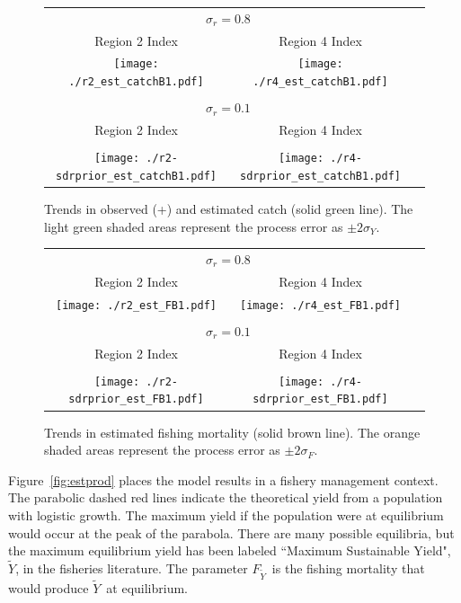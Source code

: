 \documentclass[12pt,letterpaper]{article}
\newcommand\MSY{\widetilde{Y}}
\newcommand\Fmsy{F_{\MSY}}
\begin{document}
\begin{figure}
\begin{center}
{\scriptsize \sffamily
\begin{tabular}{ccc}
\multicolumn{2}{c}{{\small $\sigma_r=0.8$}}\\
Region 2 Index & Region 4 Index\\
\hline
\texttt{[image: ./r2\_est\_catchB1.pdf]} &
\texttt{[image: ./r4\_est\_catchB1.pdf]} &
\\
\\
\multicolumn{2}{c}{{\small $\sigma_r=0.1$}}\\
Region 2 Index & Region 4 Index\\
\\
\hline
\texttt{[image: ./r2-sdrprior\_est\_catchB1.pdf]} &
\texttt{[image: ./r4-sdrprior\_est\_catchB1.pdf]} &
\end{tabular}
}
\caption{Trends in observed (+) and estimated catch (solid green
line). The light green shaded areas represent the process error as 
$\pm 2\sigma_Y$.
\label{fig:estC}}
\end{center}
\end{figure}

\begin{figure}
\begin{center}
{\scriptsize \sffamily
\begin{tabular}{ccc}
\multicolumn{2}{c}{{\small $\sigma_r=0.8$}}\\
Region 2 Index & Region 4 Index\\
\hline
\texttt{[image: ./r2\_est\_FB1.pdf]} &
\texttt{[image: ./r4\_est\_FB1.pdf]} &
\\
\\
\multicolumn{2}{c}{{\small $\sigma_r=0.1$}}\\
Region 2 Index & Region 4 Index\\
\\
\hline
\texttt{[image: ./r2-sdrprior\_est\_FB1.pdf]} &
\texttt{[image: ./r4-sdrprior\_est\_FB1.pdf]} &
\end{tabular}
}
\caption{Trends in estimated fishing mortality (solid brown
line). The orange shaded areas represent the process error as 
$\pm 2\sigma_F$.
\label{fig:estF}}
\end{center}
\end{figure}



Figure~\ref{fig:estprod} places the model results in a fishery
management context. The parabolic dashed red lines indicate the theoretical
yield from a population with logistic growth. The maximum yield if the
population were at equilibrium would occur at the  peak of the parabola.
There are many possible equilibria, but the  maximum equilibrium yield
has been labeled ``Maximum Sustainable Yield", $\MSY$, in the fisheries
literature.
The parameter $\Fmsy$\ is the fishing mortality that would produce $\MSY$\
at equilibrium. 
\end{document}

